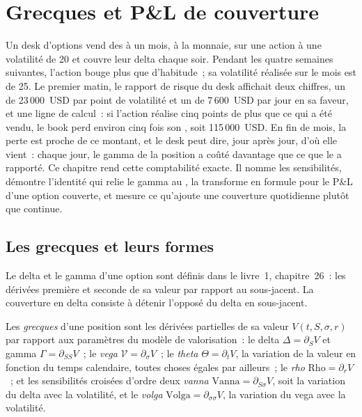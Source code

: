 \chapter{Grecques et P\&L de couverture}\label{ch:dv:greeks-and-the-hedging-pnl}

Un desk d'options vend des  à un mois, à la monnaie, sur une action
à une volatilité de 20 et couvre leur delta chaque soir. Pendant les quatre
semaines suivantes, l'action bouge plus que d'habitude~; sa volatilité réalisée sur le mois est de 25. Le
premier matin, le rapport de risque du desk affichait deux chiffres, un  de
23\,000~USD par point de volatilité et un  de 7\,600~USD par jour en sa faveur,
et une ligne de calcul~: si l'action réalise cinq points de plus que ce qui a été
vendu, le book perd environ cinq fois son , soit 115\,000~USD. En fin de
mois, la perte est proche de ce montant, et le desk peut dire, jour après jour, d'où
elle vient~: chaque jour, le gamma de la position a coûté davantage que ce que le
 a rapporté. Ce chapitre rend cette comptabilité exacte. Il nomme les
sensibilités, démontre l'identité qui relie le gamma au , la transforme en
formule pour le P\&L d'une option couverte, et mesure ce qu'ajoute une couverture
quotidienne plutôt que continue.

\section{Les grecques et leurs formes}

Le delta et le gamma d'une option sont définis dans le livre~1, chapitre~26~:
les dérivées première et seconde de sa valeur par rapport au sous-jacent.
La couverture en delta consiste à détenir l'opposé du delta en sous-jacent.

\begin{definition}[Grecques]\label{def:dv:greeks-and-the-hedging-pnl:greeks}
Les \emph{grecques} d'une position sont les dérivées partielles de sa
valeur $V(t,S,\sigma,r)$ par rapport aux paramètres du modèle de valorisation~: le delta
$\Delta=\partial_SV$ et gamma $\Gamma=\partial_{SS}V$~; le \emph{vega}
$\mathcal V=\partial_\sigma V$~; le \emph{theta} $\Theta=\partial_tV$, la
variation de la valeur en fonction du temps calendaire, toutes choses égales par ailleurs~; le \emph{rho}
$\mathrm{Rho}=\partial_rV$~; et les sensibilités croisées d'ordre deux
\emph{vanna} $\mathrm{Vanna}=\partial_{S\sigma}V$, soit la variation du delta
avec la volatilité, et le \emph{volga} $\mathrm{Volga}=\partial_{\sigma\sigma}V$,
la variation du vega avec la volatilité.
\end{definition}

